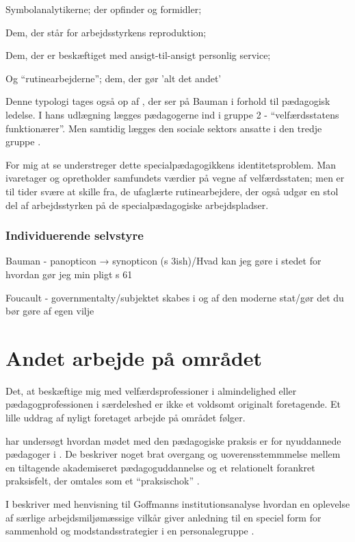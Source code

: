 Symbolanalytikerne; der opfinder og formidler;

Dem, der står for arbejdsstyrkens reproduktion;

Dem, der er beskæftiget med ansigt-til-ansigt personlig service;

Og “rutinearbejderne”; dem, der gør 'alt det andet'

Denne typologi tages også op af \citeauthor{kofodOrganisationOgLedelse2016}, der ser på Bauman i forhold til pædagogisk ledelse.
I hans udlægning lægges pædagogerne ind i gruppe 2 - “velfærdsstatens funktionærer”.
Men samtidig lægges den sociale sektors ansatte i den tredje gruppe \autocite[s. 166]{kofodOrganisationOgLedelse2016}.

For mig at se understreger dette specialpædagogikkens identitetsproblem.
Man ivaretager og opretholder samfundets værdier på vegne af velfærdsstaten; men er til tider svære at skille fra, de ufaglærte rutinearbejdere, der også udgør en stol del af arbejdsstyrken på de specialpædagogiske arbejdspladser. 

\subsubsection{Individuerende selvstyre}
Bauman - panopticon → synopticon (s 3ish)/Hvad kan jeg gøre i stedet for hvordan gør jeg min pligt s 61

Foucault - governmentalty/subjektet skabes i og af den moderne stat/gør det du bør gøre af egen vilje

\section{Andet arbejde på området}
Det, at beskæftige mig med velfærdsprofessioner i almindelighed eller pædagogprofessionen i særdeleshed er ikke et voldsomt originalt foretagende.
Et lille uddrag af nyligt foretaget arbejde på området følger.

\citeauthor{nielsenAttraktivPaPapiret2017} har undersøgt hvordan mødet med den pædagogiske praksis er for nyuddannede pædagoger i .
De beskriver noget brat overgang og uoverensstemmmelse mellem en tiltagende akademiseret pædagoguddannelse og et relationelt forankret praksisfelt, der omtales som et “praksischok” \autocite{nielsenAttraktivPaPapiret2017}.

I  beskriver \citeauthor{dreyerespersenBekymrendeIdentiteterAnbragte2010} med henvisning til Goffmanns institutionsanalyse hvordan en oplevelse af særlige arbejdsmiljømæssige vilkår giver anledning til en speciel form for sammenhold og modstandsstrategier i en personalegruppe \autocite{dreyerespersenBekymrendeIdentiteterAnbragte2010}.

